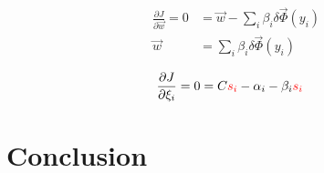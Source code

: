 \documentclass{IEEEtran}
\begin{document}
\begin{align}
    \frac{\partial J}{\partial \vec{w}} = 0 &= \vec{w} - \sum_i \beta_i \delta \vec{\Phi}\left(y_i\right) \\
    \vec{w} &= \sum_i \beta_i \delta \vec{\Phi}\left(y_i\right) \nonumber
\end{align}

\begin{align}
    \frac{\partial J}{\partial \xi_i} = 0 &= C \textcolor{red}{s_i} - \alpha_i - \beta_i \textcolor{red}{s_i}
\end{align}

\section{Conclusion} %


\end{document}
